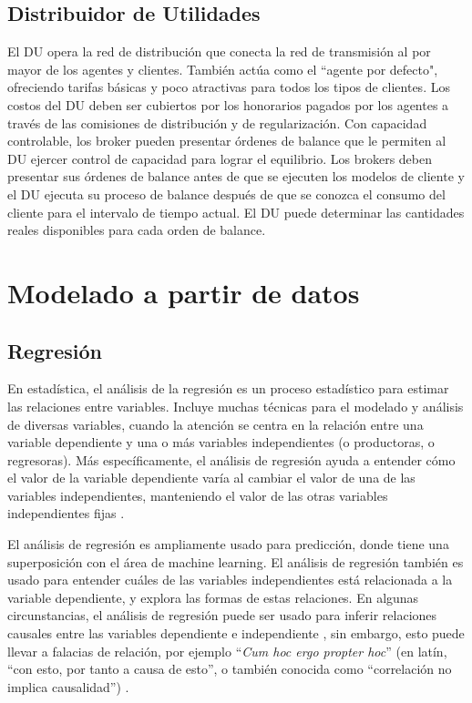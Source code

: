 \subsection{Distribuidor de Utilidades}
El DU opera la red de distribución que conecta la red de transmisión al por mayor de los agentes y clientes. También actúa como el “agente por defecto", ofreciendo tarifas básicas y poco atractivas para todos los tipos de clientes. 
Los  costos del DU deben ser cubiertos por los honorarios pagados por los agentes a través de las comisiones de distribución y de regularización. 
Con capacidad controlable, los broker pueden presentar órdenes de balance que le permiten al DU ejercer control de capacidad para lograr el equilibrio. 
Los brokers deben presentar sus órdenes de balance antes de que se ejecuten los modelos de cliente y el DU ejecuta su proceso de balance después de que se conozca el consumo del cliente para el intervalo de tiempo actual. 
El DU puede determinar las cantidades reales disponibles para cada orden de balance.
\\
\section{Modelado a partir de datos}
\subsection{Regresión}
En estadística, el análisis de la regresión es un proceso estadístico para estimar las relaciones entre variables. Incluye muchas técnicas para el modelado y análisis de diversas variables, cuando la atención se centra en la relación entre una variable
dependiente y una o más variables independientes (o productoras, o regresoras).
Más específicamente, el análisis de regresión ayuda a entender cómo el valor de la variable dependiente varía al cambiar el valor de una de las variables independientes, manteniendo el valor de las otras variables independientes fijas \cite{BoundlessRegressionAnalysis}.

El análisis de regresión es ampliamente usado para predicción, donde tiene una superposición con el área de machine learning. 
El análisis de regresión también es usado para entender cuáles de las variables independientes está relacionada a la variable dependiente, y explora las formas de estas relaciones. 
En algunas circunstancias, el análisis de regresión puede ser usado para inferir relaciones causales entre las variables dependiente e independiente \cite{BoundlessRegressionAnalysis}, sin embargo, esto puede llevar a falacias de relación, por ejemplo ``\textit{Cum hoc ergo propter hoc}'' (en latín, ``con esto, por tanto a causa de esto'', o también conocida como ``correlación no implica causalidad'') \cite{JSArmstrongIllusions}.

